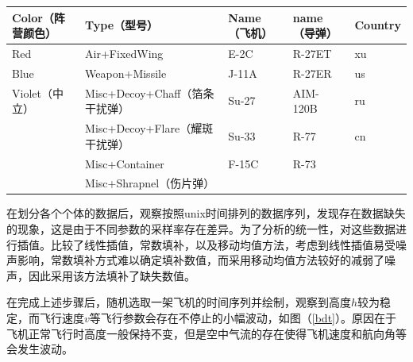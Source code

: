 \documentclass{my_paper}
\begin{document}
\begin{table}[h]
\begin{tabular}{|l|l|l|l|l|}
    \hline
        Color（阵营颜色） & Type（型号） & Name（飞机） & name（导弹） & Country \\ \hline
        Red & Air+FixedWing & E-2C & R-27ET & xu \\ 
        Blue & Weapon+Missile & J-11A & R-27ER & us \\ 
        Violet（中立） & Misc+Decoy+Chaff（箔条干扰弹） & Su-27 & AIM-120B & ru \\ 
        ~ & Misc+Decoy+Flare（耀斑干扰弹） & Su-33 & R-77 & cn \\ 
        ~ & Misc+Container & F-15C & R-73 & \\ 
        ~ & Misc+Shrapnel（伤片弹） &&&\\ \hline
    \end{tabular}
\label{tp}
  \end{table}

在划分各个个体的数据后，观察按照unix时间排列的数据序列，发现存在数据缺失的现象，这是由于不同参数的采样率存在差异。为了分析的统一性，对这些数据进行插值。比较了线性插值，常数填补，以及移动均值方法，考虑到线性插值易受噪声影响，常数填补方式难以确定填补数值，而采用移动均值方法较好的减弱了噪声，因此采用该方法填补了缺失数值。


在完成上述步骤后，随机选取一架飞机的时间序列并绘制，观察到高度$h$较为稳定，而飞行速度$v$等飞行参数会存在不停止的小幅波动，如图（\ref{bdt}）。原因在于飞机正常飞行时高度一般保持不变，但是空中气流的存在使得飞机速度和航向角等会发生波动。
\end{document}
